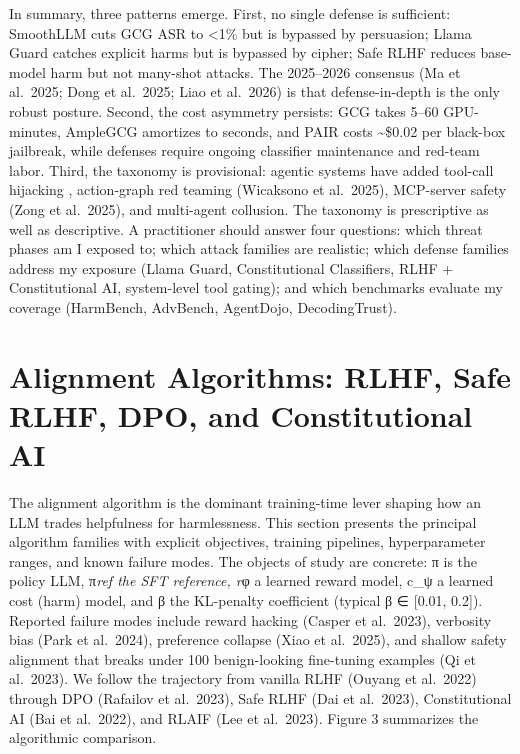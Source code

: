 \documentclass{article}
\begin{document}
In summary, three patterns emerge. First, no single defense is sufficient: SmoothLLM cuts GCG ASR to \textless1\% but is bypassed by persuasion; Llama Guard catches explicit harms but is bypassed by cipher; Safe RLHF reduces base-model harm but not many-shot attacks. The 2025--2026 consensus (Ma et al.~2025; Dong et al.~2025; Liao et al.~2026) is that defense-in-depth is the only robust posture. Second, the cost asymmetry persists: GCG takes 5--60 GPU-minutes, AmpleGCG amortizes to seconds, and PAIR costs \textasciitilde\$0.02 per black-box jailbreak, while defenses require ongoing classifier maintenance and red-team labor. Third, the taxonomy is provisional: agentic systems have added tool-call hijacking \citep{debenedetti2024arxiv2406133522024}, action-graph red teaming (Wicaksono et al.~2025), MCP-server safety (Zong et al.~2025), and multi-agent collusion. The taxonomy is prescriptive as well as descriptive. A practitioner should answer four questions: which threat phases am I exposed to; which attack families are realistic; which defense families address my exposure (Llama Guard, Constitutional Classifiers, RLHF + Constitutional AI, system-level tool gating); and which benchmarks evaluate my coverage (HarmBench, AdvBench, AgentDojo, DecodingTrust).

\section{Alignment Algorithms: RLHF, Safe RLHF, DPO, and Constitutional AI}\label{alignment-algorithms-rlhf-safe-rlhf-dpo-and-constitutional-ai}

The alignment algorithm is the dominant training-time lever shaping how an LLM trades helpfulness for harmlessness. This section presents the principal algorithm families with explicit objectives, training pipelines, hyperparameter ranges, and known failure modes. The objects of study are concrete: π is the policy LLM, π\emph{ref the SFT reference, r}φ a learned reward model, c\_ψ a learned cost (harm) model, and β the KL-penalty coefficient (typical β ∈ {[}0.01, 0.2{]}). Reported failure modes include reward hacking (Casper et al.~2023), verbosity bias (Park et al.~2024), preference collapse (Xiao et al.~2025), and shallow safety alignment that breaks under 100 benign-looking fine-tuning examples (Qi et al.~2023). We follow the trajectory from vanilla RLHF (Ouyang et al.~2022) through DPO (Rafailov et al.~2023), Safe RLHF (Dai et al.~2023), Constitutional AI (Bai et al.~2022), and RLAIF (Lee et al.~2023). Figure 3 summarizes the algorithmic comparison.
\end{document}
